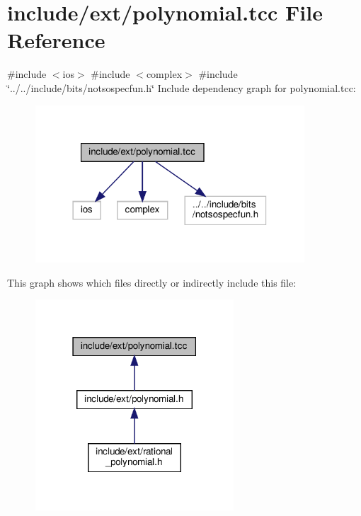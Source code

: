 \hypertarget{polynomial_8tcc}{}\section{include/ext/polynomial.tcc File Reference}
\label{polynomial_8tcc}
{\ttfamily \#include $<$ios$>$}\newline
{\ttfamily \#include $<$complex$>$}\newline
{\ttfamily \#include \char`\"{}../../include/bits/notsospecfun.\+h\char`\"{}}\newline
Include dependency graph for polynomial.\+tcc\+:
\nopagebreak
\begin{figure}[H]
\begin{center}
\leavevmode
\includegraphics[width=285pt]{polynomial_8tcc__incl}
\end{center}
\end{figure}
This graph shows which files directly or indirectly include this file\+:
\nopagebreak
\begin{figure}[H]
\begin{center}
\leavevmode
\includegraphics[width=210pt]{polynomial_8tcc__dep__incl}
\end{center}
\end{figure}
